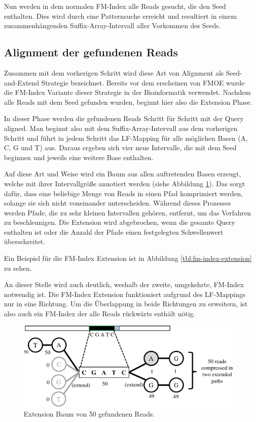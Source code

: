 Nun werden in dem normalen FM-Index alle Reads gesucht, die den Seed enthalten. Dies wird durch eine Patternsuche erreicht und resultiert in einem zusammenhängenden Suffix-Array-Intervall aller Vorkommen des Seeds.


\subsection{Alignment der gefundenen Reads}
\label{subsec:alignment}

Zusammen mit dem vorherigen Schritt wird diese Art von Alignment als Seed-and-Extend Strategie bezeichnet.
Bereits vor dem erscheinen von FMOE wurde die FM-Index Variante \cite{FmIndexExtension} dieser Strategie in der Bioinformatik verwendet.
Nachdem alle Reads mit dem Seed gefunden wurden, beginnt hier also die Extension Phase.

In dieser Phase werden die gefundenen Reads Schritt für Schritt mit der Query aligned.
Man beginnt also mit dem Suffix-Array-Intervall aus dem vorherigen Schritt und führt in jedem Schritt das LF-Mapping für alle möglichen Basen (A, C, G und T) aus.
Daraus ergeben sich vier neue Intervalle, die mit dem Seed beginnen und jeweils eine weitere Base enthalten.

Auf diese Art und Weise wird ein Baum aus allen auftretenden Basen erzeugt, welche mit ihrer Intervallgröße annotiert werden (siehe Abbildung \ref{fig:extension}).
Das sorgt dafür, dass eine beliebige Menge von Reads in einen Pfad komprimiert werden, solange sie sich nicht voneinander unterscheiden.
Während dieses Prozesses werden Pfade, die zu sehr kleinen Intervallen gehören, entfernt, um das Verfahren zu beschleunigen.
Die Extension wird abgebrochen, wenn die gesamte Query enthalten ist oder die Anzahl der Pfade einen festgelegten Schwellenwert überschreitet.

Ein Beispiel für die FM-Index Extension ist in Abbildung \ref{tbl:fm-index-extension} zu sehen.

An dieser Stelle wird auch deutlich, weshalb der zweite, umgekehrte, FM-Index notwendig ist.
Die FM-Index Extension funktioniert aufgrund des LF-Mappings nur in eine Richtung. Um die Überlappung in beide Richtungen zu erweitern, ist also auch ein FM-Index der alle Reads rückwärts enthält nötig.

\begin{figure}[h]
	\begin{center}
		\includegraphics[]{./img/extension.png}
	\end{center}
	\caption{Extension Baum von 50 gefundenen Reads.}
	\label{fig:extension}
\end{figure}

